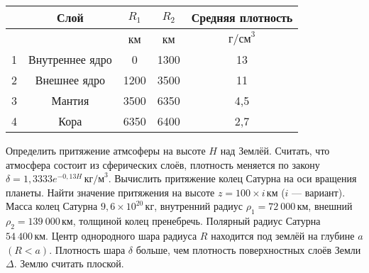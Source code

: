 \documentclass[11pt, a4paper,addpoints]{exam}
\theoremstyle{remark}
\begin{document}
\begin{questions}
\begin{table}[h]
            \centering
            \begin{tabular}{|c|c|c|c|c|}
                \hline
                & Слой & $R_1$ & $R_2$ & Средняя плотность \\\hline
                &  & км & км & $\text{г/см}^3$ \\\hline
                1 & Внутреннее ядро  & 0  & 1300  & 13 \\\hline
                2 & Внешнее ядро  & 1200  & 3500  & 11 \\\hline
                3 & Мантия  & 3500  & 6350  & 4,5 \\\hline
                4 & Кора & 6350  & 6400  & 2,7 \\\hline
            \end{tabular}
        \end{table}
        \question[2] Определить притяжение атмсоферы на высоте $H$ над Землёй. Считать, что
        атмосфера состоит из сферических слоёв, плотность меняется по закону $\delta = 1,3333
        e^{-0,13H}\,\text{кг/м}^3$.
        \question[2] Вычислить притяжение колец Сатурна на оси вращения планеты. Найти значение
        притяжения на высоте $z = 100\times i\,\text{км}$ ($i$ --- вариант). Масса колец Сатурна 
        $9,6\times 10^{20}\,\text{кг}$, внутренний
        радиус $\rho_1 = 72\ 000\,\text{км}$, внешний $\rho_2 = 139\ 000\,\text{км}$, толщиной колец
        пренебречь. Полярный радиус Сатурна $54\ 400\,\text{км}$.
        \question[3] Центр однородного шара радиуса $R$ находится под землёй на глубине $a$ $(R < a)$.
        Плотность шара $\delta$ больше, чем плотность поверхностных слоёв Земли $\Delta$. 
        Землю считать плоской.
\end{questions}
\end{document}
